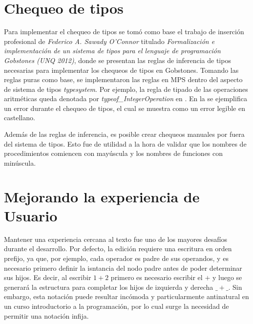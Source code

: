 

\section{Chequeo de tipos}\label{chequeo}

Para implementar el chequeo de tipos se tomó como base el trabajo de inserción profesional de \textit{Federico A. Sawady O’Connor} titulado \textit{Formalización e implementación de un sistema de tipos para el lenguaje de programación Gobstones (UNQ 2012)}, donde se presentan las reglas de inferencia de tipos necesarias para implementar los chequeos de tipos en Gobstones. 
Tomando las reglas puras como base, se implementaron las reglas en MPS dentro del aspecto de sistema de tipos \textit{typesystem}. Por ejemplo, la regla de tipado de las operaciones aritméticas queda denotada por \textit{typeof\_IntegerOperation} en .
En la  se ejemplifica un error durante el chequeo de tipos, el cual se muestra como un error legible en castellano.


Además de las reglas de inferencia, es posible crear chequeos manuales por fuera del sistema de tipos. Esto fue de utilidad a la hora de validar que los nombres de procedimientos comiencen con mayúscula y los nombres de funciones con minúscula.

\bigskip
\section{Mejorando la experiencia de Usuario}\label{usabilidad}

Mantener una experiencia cercana al texto fue uno de los mayores desafíos durante el desarrollo. Por defecto, la edición requiere una escritura en orden prefijo, ya que, por ejemplo, cada operador es padre de sus operandos, y es necesario primero definir la isntancia del nodo padre antes de poder determinar sus hijos.
Es decir, al escribir $1+2$ primero es necesario escribir el $+$ y luego se generará la estructura para completar los hijos de izquierda y derecha $\_ + \_$. Sin embargo, esta notación puede resultar incómoda y particularmente antinatural en un curso introductorio a la programación, por lo cual surge la necesidad de permitir una notación infija.

